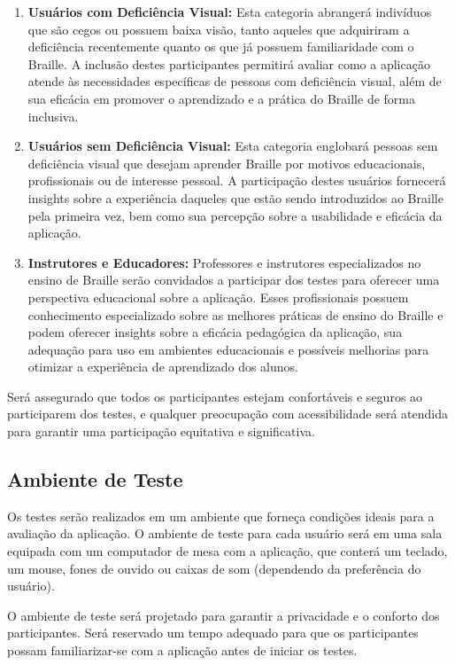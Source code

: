 \begin{enumerate}
    \item \textbf{Usuários com Deficiência Visual:} Esta categoria abrangerá indivíduos que são cegos ou possuem baixa visão, tanto aqueles que adquiriram a deficiência recentemente quanto os que já possuem familiaridade com o Braille. A inclusão destes participantes permitirá avaliar como a aplicação atende às necessidades específicas de pessoas com deficiência visual, além de sua eficácia em promover o aprendizado e a prática do Braille de forma inclusiva.

    \item \textbf{Usuários sem Deficiência Visual:} Esta categoria englobará pessoas sem deficiência visual que desejam aprender Braille por motivos educacionais, profissionais ou de interesse pessoal. A participação destes usuários fornecerá insights sobre a experiência daqueles que estão sendo introduzidos ao Braille pela primeira vez, bem como sua percepção sobre a usabilidade e eficácia da aplicação.

    \item \textbf{Instrutores e Educadores:} Professores e instrutores especializados no ensino de Braille serão convidados a participar dos testes para oferecer uma perspectiva educacional sobre a aplicação. Esses profissionais possuem conhecimento especializado sobre as melhores práticas de ensino do Braille e podem oferecer insights sobre a eficácia pedagógica da aplicação, sua adequação para uso em ambientes educacionais e possíveis melhorias para otimizar a experiência de aprendizado dos alunos.
\end{enumerate}

Será assegurado que todos os participantes estejam confortáveis e seguros ao participarem dos testes, e qualquer preocupação com acessibilidade será atendida para garantir uma participação equitativa e significativa.

\subsection{Ambiente de Teste}

Os testes serão realizados em um ambiente que forneça condições ideais para a avaliação da aplicação. O ambiente de teste para cada usuário será em uma sala equipada com um computador de mesa com a aplicação, que conterá um teclado, um mouse, fones de ouvido ou caixas de som (dependendo da preferência do usuário).

O ambiente de teste será projetado para garantir a privacidade e o conforto dos participantes. Será reservado um tempo adequado para que os participantes possam familiarizar-se com a aplicação antes de iniciar os testes.

